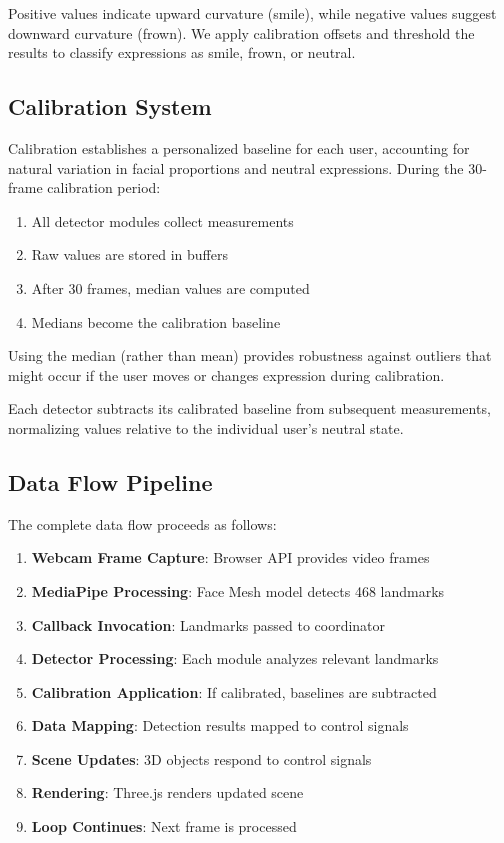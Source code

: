 \documentclass[sigconf]{acmart}
\begin{document}
Positive values indicate upward curvature (smile), while negative values suggest downward curvature (frown). We apply calibration offsets and threshold the results to classify expressions as smile, frown, or neutral.

\subsection{Calibration System}

Calibration establishes a personalized baseline for each user, accounting for natural variation in facial proportions and neutral expressions. During the 30-frame calibration period:

\begin{enumerate}
\item All detector modules collect measurements
\item Raw values are stored in buffers
\item After 30 frames, median values are computed
\item Medians become the calibration baseline
\end{enumerate}

Using the median (rather than mean) provides robustness against outliers that might occur if the user moves or changes expression during calibration.

Each detector subtracts its calibrated baseline from subsequent measurements, normalizing values relative to the individual user's neutral state.

\subsection{Data Flow Pipeline}

The complete data flow proceeds as follows:

\begin{enumerate}
\item \textbf{Webcam Frame Capture}: Browser API provides video frames
\item \textbf{MediaPipe Processing}: Face Mesh model detects 468 landmarks
\item \textbf{Callback Invocation}: Landmarks passed to coordinator
\item \textbf{Detector Processing}: Each module analyzes relevant landmarks
\item \textbf{Calibration Application}: If calibrated, baselines are subtracted
\item \textbf{Data Mapping}: Detection results mapped to control signals
\item \textbf{Scene Updates}: 3D objects respond to control signals
\item \textbf{Rendering}: Three.js renders updated scene
\item \textbf{Loop Continues}: Next frame is processed
\end{enumerate}
\end{document}
